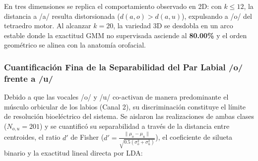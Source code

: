\documentclass[11pt,a4paper,openany]{book}
\theoremstyle{definition}
\begin{document}
En tres dimensiones se replica el comportamiento observado en 2D: con $k \le 12$, la distancia a /a/ resulta distorsionada ($d(a, o) > d(a, u)$), expulsando a /o/ del tetraedro motor. Al alcanzar $k = 20$, la variedad 3D se desdobla en un arco estable donde la exactitud GMM no supervisada asciende al \textbf{80.00\%} y el orden geométrico se alinea con la anatomía orofacial.

\subsubsection{Cuantificación Fina de la Separabilidad del Par Labial /o/ frente a /u/}
\label{subsubsec:separabilidad_fina_o_u}

Debido a que las vocales /o/ y /u/ co-activan de manera predominante el músculo orbicular de los labios (Canal 2), su discriminación constituye el límite de resolución bioeléctrico del sistema. Se aislaron las realizaciones de ambas clases ($N_{o,u} = 201$) y se cuantificó su separabilidad a través de la distancia entre centroides, el ratio $d'$ de Fisher ($d' = \frac{\|\mu_o - \mu_u\|}{\sqrt{0.5(\sigma_o^2 + \sigma_u^2)}}$), el coeficiente de silueta binario y la exactitud lineal directa por LDA:
\end{document}
